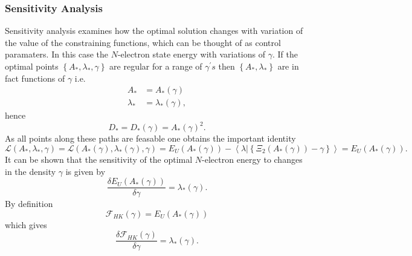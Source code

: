 \documentclass[aps,preprint]{revtex4}%
\begin{document}
\subsubsection{Sensitivity Analysis}

Sensitivity analysis \cite{sensitivity} examines how the optimal solution
changes with variation of the value of the constraining functions, which can
be thought of as control paramaters. In this case the $N$-electron state
energy with variations of $\gamma.$ If the optimal points $\left\{  A_{\ast
},\lambda_{\ast},\gamma\right\}  $ are regular for a range of $\gamma^{\prime
}s$ then $\left\{  A_{\ast},\lambda_{\ast}\right\}  $ are in fact functions of
$\gamma$ \cite{weiner2005} i.e.
\begin{align}
A_{\ast}  &  =A_{\ast}\left(  \gamma\right) \nonumber\\
\lambda_{\ast}  &  =\lambda_{\ast}\left(  \gamma\right)  ,
\end{align}
hence
\begin{equation}
D_{\ast}=D_{\ast}\left(  \gamma\right)  =A_{\ast}\left(  \gamma\right)  ^{2}.
\end{equation}
As all points along these paths are feasable one obtains the important
identity
\begin{equation}
\mathcal{L}\left(  A_{\ast},\lambda_{\ast},\gamma\right)  =\mathcal{L}\left(
A_{\ast}\left(  \gamma\right)  ,\lambda_{\ast}\left(  \gamma\right)
,\gamma\right)  =E_{U}\left(  A_{\ast}\left(  \gamma\right)  \right)
-\left\langle \left.  \lambda\right\vert \left\{  \Xi_{2}\left(  A_{\ast
}\left(  \gamma\right)  \right)  -\gamma\right\}  \right\rangle =E_{U}\left(
A_{\ast}\left(  \gamma\right)  \right)  .
\end{equation}
It can be shown \cite{Hestenes} that the sensitivity of the optimal
$N$-electron energy to changes in the density $\gamma$ is given by
\begin{equation}
\frac{\delta E_{U}\left(  A_{\ast}\left(  \gamma\right)  \right)  }%
{\delta\gamma}=\lambda_{\ast}\left(  \gamma\right)  .
\end{equation}
By definition
\begin{equation}
\mathcal{F}_{HK}\left(  \gamma\right)  =E_{U}\left(  A_{\ast}\left(
\gamma\right)  \right)
\end{equation}
which gives
\begin{equation}
\frac{\delta\mathcal{F}_{HK}\left(  \gamma\right)  }{\delta\gamma}%
=\lambda_{\ast}\left(  \gamma\right)  .
\end{equation}
\end{document}
